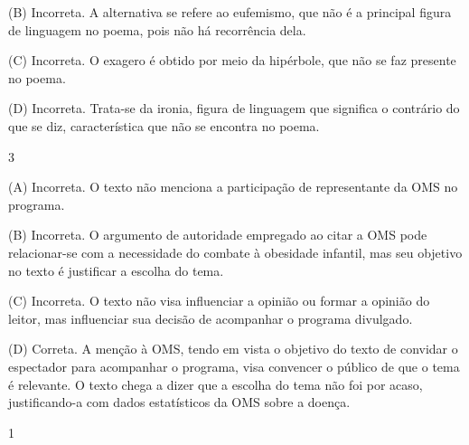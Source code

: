 (B)
Incorreta. A alternativa se refere ao eufemismo, que não é a principal
figura de linguagem no poema, pois não há recorrência dela. 

(C)
Incorreta. O exagero é obtido por meio da hipérbole, que não se faz
presente no poema. 

(D) Incorreta. Trata-se da ironia, figura de
linguagem que significa o contrário do que se diz, característica que
não se encontra no poema.

\num{3}

(A) Incorreta. O texto não menciona a participação de representante da
OMS no programa. 

(B) Incorreta. O argumento de autoridade empregado ao
citar a OMS pode relacionar-se com a necessidade do combate à obesidade
infantil, mas seu objetivo no texto é justificar a escolha do tema. 

(C)
Incorreta. O texto não visa influenciar a opinião ou formar a opinião do
leitor, mas influenciar sua decisão de acompanhar o programa divulgado.

(D) Correta. A menção à OMS, tendo em vista o objetivo do texto de
convidar o espectador para acompanhar o programa, visa convencer o
público de que o tema é relevante. O texto chega a dizer que a escolha
do tema não foi por acaso, justificando-a com dados estatísticos da OMS
sobre a doença.


\num{1}


